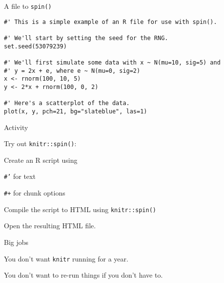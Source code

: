 \documentclass[12pt,t]{beamer}
\begin{document}
\begin{frame}[fragile]{A file to {\tt spin()}}

\vspace{24pt}

\begin{lstlisting}
#' This is a simple example of an R file for use with spin().

#' We'll start by setting the seed for the RNG.
set.seed(53079239)

#' We'll first simulate some data with x ~ N(mu=10, sig=5) and
#' y = 2x + e, where e ~ N(mu=0, sig=2)
x <- rnorm(100, 10, 5)
y <- 2*x + rnorm(100, 0, 2)

#' Here's a scatterplot of the data.
plot(x, y, pch=21, bg="slateblue", las=1)
\end{lstlisting}

\end{frame}



\begin{frame}[c]{Activity}

Try out {\tt knitr::spin()}:

  \bi
      \item Create an R script using
      \bi
          \item {\tt \#'} for text
          \item {\tt \#+} for chunk options
      \ei
      \item Compile the script to HTML using {\tt knitr::spin()}
      \item Open the resulting HTML file.
  \ei


\end{frame}




\begin{frame}{Big jobs}

\bbi
\item You don't want {\tt knitr} running for a year.

\item You don't want to re-run things if you don't have to.
\ei

\end{frame}
\end{document}
